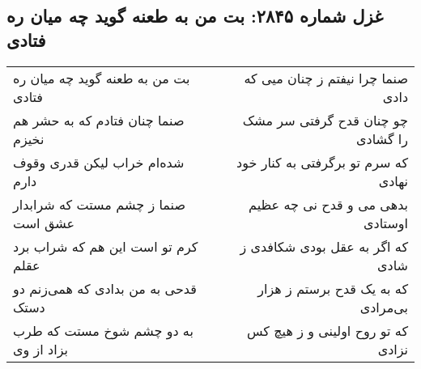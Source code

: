 \begin{center}
\section*{غزل شماره ۲۸۴۵: بت من به طعنه گوید چه میان ره فتادی}
\label{sec:2845}
\begin{longtable}{l p{0.5cm} r}
بت من به طعنه گوید چه میان ره فتادی
&&
صنما چرا نیفتم ز چنان میی که دادی
\\
صنما چنان فتادم که به حشر هم نخیزم
&&
چو چنان قدح گرفتی سر مشک را گشادی
\\
شده‌ام خراب لیکن قدری وقوف دارم
&&
که سرم تو برگرفتی به کنار خود نهادی
\\
صنما ز چشم مستت که شرابدار عشق است
&&
بدهی می و قدح نی چه عظیم اوستادی
\\
کرم تو است این هم که شراب برد عقلم
&&
که اگر به عقل بودی شکافدی ز شادی
\\
قدحی به من بدادی که همی‌زنم دو دستک
&&
که به یک قدح برستم ز هزار بی‌مرادی
\\
به دو چشم شوخ مستت که طرب بزاد از وی
&&
که تو روح اولینی و ز هیچ کس نزادی
\\
\end{longtable}
\end{center}
